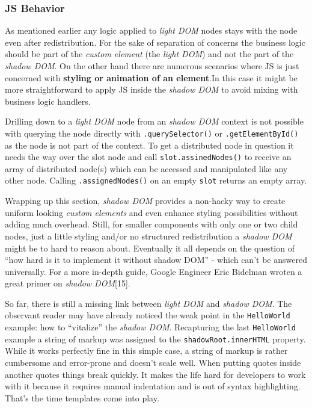 \documentclass[]{article}
\begin{document}
\subsubsection{JS Behavior}\label{js-behavior}

As mentioned earlier any logic applied to \emph{light DOM} nodes stays
with the node even after redistribution. For the sake of separation of
concerns the business logic should be part of the \emph{custom element}
(the \emph{light DOM}) and not the part of the \emph{shadow DOM}. On the
other hand there are numerous scenarios where JS is just concerned with
\textbf{styling or animation of an element}.In this case it might be
more straightforward to apply JS inside the \emph{shadow DOM} to avoid
mixing with business logic handlers.

Drilling down to a \emph{light DOM} node from an \emph{shadow DOM}
context is not possible with querying the node directly with
\texttt{.querySelector()} or \texttt{.getElementById()} as the node is
not part of the context. To get a distributed node in question it needs
the way over the slot node and call \texttt{slot.assinedNodes()} to
receive an array of distributed node(s) which can be accessed and
manipulated like any other node. Calling \texttt{.assignedNodes()} on an
empty \texttt{slot} returns an empty array.

Wrapping up this section, \emph{shadow DOM} provides a non-hacky way to
create uniform looking \emph{custom elements} and even enhance styling
possibilities without adding much overhead. Still, for smaller
components with only one or two child nodes, just a little styling
and/or no structured redistribution a \emph{shadow DOM} might be to hard
to reason about. Eventually it all depends on the question of ``how hard
is it to implement it without shadow DOM'' - which can't be answered
universally. For a more in-depth guide, Google Engineer Eric Bidelman
wroten a great primer on \emph{shadow DOM}{[}15{]}.

So far, there is still a missing link between \emph{light DOM} and
\emph{shadow DOM}. The observant reader may have already noticed the
weak point in the \texttt{HelloWorld} example: how to ``vitalize'' the
\emph{shadow DOM}. Recapturing the last \texttt{HelloWorld} example a
string of markup was assigned to the \texttt{shadowRoot.innerHTML}
property. While it works perfectly fine in this simple case, a string of
markup is rather cumbersome and error-prone and doesn't scale well. When
putting quotes inside another quotes things break quickly. It makes the
life hard for developers to work with it because it requires manual
indentation and is out of syntax highlighting. That's the time templates
come into play.
\end{document}
